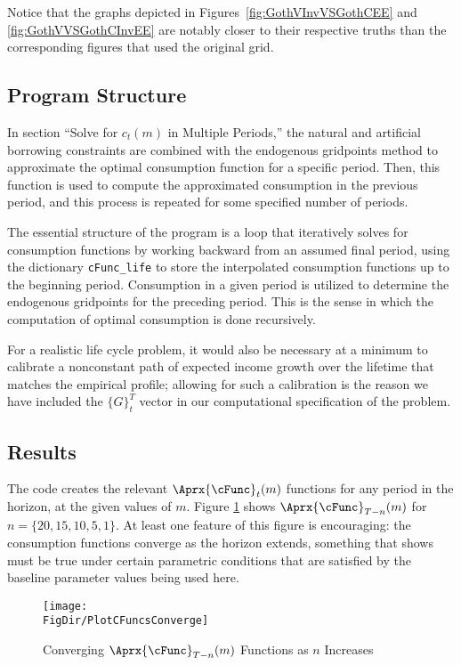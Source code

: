 \documentclass[titlepage, headings=optiontotocandhead]{Resources/texmf-local/tex/latex/econtex}
\begin{document}
Notice that the graphs depicted in Figures~\ref{fig:GothVInvVSGothCEE} and \ref{fig:GothVVSGothCInvEE} are notably closer to their respective truths than the corresponding figures that used the original grid.

\subsection{Program Structure}

In section ``Solve for $c_t(m)$ in Multiple Periods,'' the natural and artificial borrowing constraints are combined with the endogenous gridpoints method to approximate the optimal consumption function for a specific period. Then, this function is used to compute the approximated consumption in the previous period, and this process is repeated for some specified number of periods.

The essential structure of the program is a loop that iteratively solves for consumption functions by working backward from an assumed final period, using the dictionary \texttt{cFunc\_life} to store the interpolated consumption functions up to the beginning period. Consumption in a given period is utilized to determine the endogenous gridpoints for the preceding period. This is the sense in which the computation of optimal consumption is done recursively.

For a realistic life cycle problem, it would also be necessary at a
minimum to calibrate a nonconstant path of expected income growth over the
lifetime that matches the empirical profile; allowing for such
a calibration is the reason we have included the $\{G\}_{t}^{T}$
vector in our computational specification of the problem.

\hypertarget{results}{}
\subsection{Results}

The code creates the relevant $\Aprx{\cFunc}_{t}(m)$ functions for any period in the horizon, at the given values of $m$.  Figure \ref{fig:PlotCFuncsConverge} shows $\Aprx{\cFunc}_{T-n}(m)$ for $n=\{20,15,10,5,1\}$.  At least one feature of this figure is encouraging: the consumption functions converge as the horizon extends, something that \cite{BufferStockTheory} shows must be true under certain parametric conditions that are satisfied by the baseline parameter values being used here.

\hypertarget{PlotCFuncsConverge}{}
\begin{figure}
  \texttt{[image: \\FigDir/PlotCFuncsConverge]}
  \caption{Converging $\Aprx{\cFunc}_{T-n}(m)$ Functions as $n$ Increases}
  \label{fig:PlotCFuncsConverge}
\end{figure}
\end{document}
